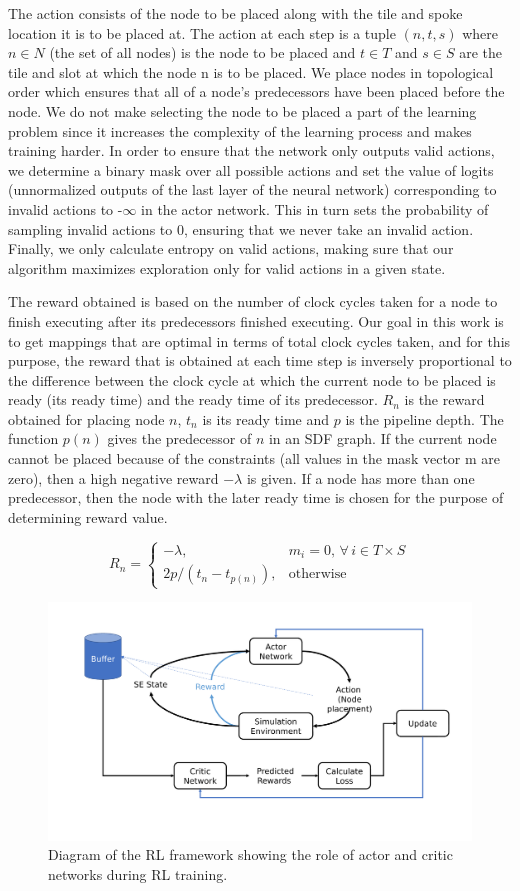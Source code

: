 The action consists of the node to be placed along with the tile and spoke location it is to be placed at. 
The action at each step is a tuple \((n,t,s)\) where $n \in N$ (the set of all nodes) is the node to be placed and $t \in T$ and $s \in S$ are the tile and slot at which the node n is to be placed. 
We place nodes in topological order which ensures that all of a node's predecessors have been placed before the node. 
We do not make selecting the node to be placed a part of the learning problem since it increases the complexity of the learning process and makes training harder.
In order to ensure that the network only outputs valid actions, we determine a binary mask over all possible actions and set the value of logits (unnormalized outputs of the last layer of the neural network) corresponding to invalid actions to -$\infty$ in the actor network. 
This in turn sets the probability of sampling invalid actions to 0, ensuring that we never take an invalid action. 
Finally, we only calculate entropy on valid actions, making sure that our algorithm maximizes exploration only for valid actions in a given state. 

The reward obtained is based on the number of clock cycles taken for a node to finish executing after its predecessors finished executing. 
Our goal in this work is to get mappings that are optimal in terms of total clock cycles taken, and for this purpose, the reward that is obtained at each time step is inversely proportional to the difference between the clock cycle at which the current node to be placed is ready (its ready time) and the ready time of its predecessor. 
$R_n$ is the reward obtained for placing node $n$, $t_n$ is its ready time and $p$ is the pipeline depth. 
The function $p(n)$ gives the predecessor of $n$ in an SDF graph. 
If the current node cannot be placed because of the constraints (all values in the mask vector m are zero), then a high negative reward $-\lambda$ is given. 
If a node has more than one predecessor, then the node with the later ready time is chosen for the purpose of determining reward value. 

\[
  R_n =
  \begin{cases}
    -\lambda,& m_i = 0, \, \forall \, i \in T \times S \\
    2p/(t_n - t_{p(n)}), & \text{otherwise}
    
  \end{cases}
\]

\begin{figure}[tb]
  \centering
  \includegraphics[trim=35 35 35 35, clip, width=0.6\linewidth]{fig/ppo.pdf}
  \caption{Diagram of the RL framework showing the role of actor and critic networks during RL training. }
  \label{fig:ppo}
\end{figure}


